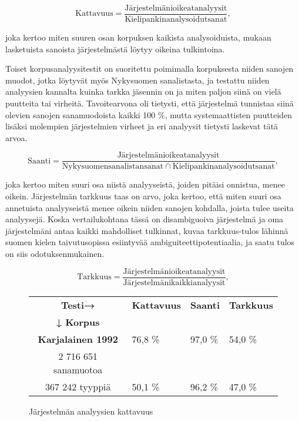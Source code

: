 \documentclass[free]{flammie}
\begin{document}
\begin{equation}
\mathrm{Kattavuus} =
    \frac{\mathrm{Järjestelmäni oikeat analyysit}}{\mathrm{Kielipankin
    analysoidut sanat}}\mathrm{,}
\end{equation}

joka kertoo miten suuren osan korpuksen kaikista analysoiduista, mukaan lasketuista sanoista järjestelmästä löytyy oikeina tulkintoina.

Toiset korpusanalyysitestit on suoritettu poimimalla korpuksesta niiden sanojen
muodot, jotka löytyvät myös Nykysuomen sanalistasta, ja testattu niiden analyysien kannalta kuinka tarkka jäsennin on ja miten paljon siinä on vielä puutteita tai
virheitä. Tavoitearvona oli tietysti, että järjestelmä tunnistaa siinä olevien sanojen
sanamuodoista kaikki 100 \%, mutta systemaattisten puutteiden lisäksi molempien
järjestelmien virheet ja eri analyysit tietysti laskevat tätä arvoa.

\begin{equation}
    \mathrm{Saanti} =
    \frac{\mathrm{Järjestelmäni oikeat analyysit}}{\mathrm{Nykysuomen sanalistan
    sanat ∩ Kielipankin analysoidut sanat}}\mathrm{,}
\end{equation}

joka kertoo miten suuri osa niistä analyyseistä, joiden pitäisi onnistua, menee oikein.
Järjestelmän tarkkuus taas on arvo, joka kertoo, että miten suuri osa annetuista
analyyseistä menee oikein niiden sanojen kohdalla, joista tulee useita analyysejä. Koska vertailukohtana tässä on disambiguoiva järjestelmä ja oma järjestelmäni
antaa kaikki mahdolliset tulkinnat, kuvaa tarkkuus-tulos lähinnä suomen kielen
taivutusopissa esiintyvää ambiguiteettipotentiaalia, ja saatu tulos on siis odotuksenmukainen.

\begin{equation}
    \mathrm{Tarkkuus} =
    \frac{\mathrm{Järjestelmäni oikeat analyysit}}{\mathrm{Järjestelmäni kaikki
    analyysit}}\mathrm{,}
\end{equation}

\begin{figure}
    \caption{Järjestelmän analyysien kattavuus}
    \begin{tabular}{c|l|l|l}
        \hline
        \bf Testi→ & \bf Kattavuus & \bf Saanti &\bf Tarkkuus \\
        \bf ↓ Korpus & & &\\
        \bf Karjalainen 1992 & 76,8 \% & 97,0 \% & 54,0 \% \\
        2 716 651 sanamuotoa & & & \\
        \hline
        367 242 tyyppiä & 50,1 \% & 96,2 \% & 47,0 \% \\
        \hline
    \end{tabular}
\end{figure}
\end{document}
